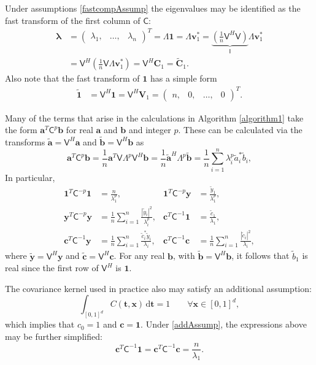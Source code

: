 \documentclass{iitthesis}          %
\newcommand{\bm}[1]{\boldsymbol{#1}}
\newcommand{\D}[1]{\text{d}{#1}}
\newcommand{\vlambda}{{\bm{\lambda}}}
\newcommand{\va}{\bm{a}}
\newcommand{\vb}{\bm{b}}
\newcommand{\vc}{\bm{c}}
\newcommand{\vC}{\bm{C}}
\newcommand{\vt}{\bm{t}}
\newcommand{\vv}{\bm{v}}
\newcommand{\vV}{\bm{V}}
\newcommand{\vx}{\bm{x}}
\newcommand{\vy}{\bm{y}}
\newcommand{\vone}{\bm{1}}
\newcommand{\mC}{\mathsf{C}}
\newcommand{\mCInv}{{\mathsf{C}^{-1}}}
\newcommand{\mLambda}{\mathsf{\Lambda}}
\newcommand{\mV}{\mathsf{V}}
\def\abs#1{\ensuremath{\left \lvert #1 \right \rvert}}
\begin{document}
Under assumptions \eqref{fastcompAssump} the eigenvalues may be identified as the fast transform of the first column of $\mC$:
\begin{align}
\nonumber
\vlambda 
& = \begin{pmatrix}
\lambda_1, &\dots, &\lambda_n
\end{pmatrix}^T = \mLambda \vone = \mLambda \vv_1^* 
= \underbrace{\left( \frac 1n \mV^H  \mV \right) }_{\mathsf{I}} \mLambda \vv_1^* \\
&= \mV^H \left( \frac 1n \mV \mLambda \vv_1^* \right)
= \mV^H \vC_1 =  \widetilde{\vC}_1.
\label{eqn:fast_transform_to_eigvalues}
\end{align}
Also note that the fast transform of $\vone$ has a simple form
\begin{align*} 
\widetilde{\vone}
& = \mV^H \vone = \mV^H \vV_1 = \begin{pmatrix}n, & 0, & \dots, & 0 \end{pmatrix}^T.
\label{eqn:fast_transform_one}
\end{align*}

Many of the terms that arise in the calculations in  Algorithm \ref{algorithm1} take the form $\va^T\mC^{p}\vb$ for real $\va$ and $\vb$ and integer $p$.  These can be calculated via the transforms $\widetilde{\va} = \mV^H \va$ and $\widetilde{\vb} = \mV^H \vb$ as 
\begin{equation*}
\va^T\mC^p\vb = \frac 1n \va^T \mV \mLambda^p \mV^H \vb
= \frac 1n \widetilde{\va}^H\mLambda^p \widetilde{\vb}
= \frac 1n \sum_{i=1}^n \lambda_i^p \widetilde{a}_i^* \widetilde{b}_i, 
\end{equation*}
In particular,
\begin{align*}
\vone^T\mC^{-p}\vone & = \frac{n}{\lambda_1^p},
&
\vone^T\mC^{-p}\vy &= \frac{\widetilde{y}_1}{\lambda_1^p},
\\
\vy^T\mC^{-p} \vy &= \frac 1n \sum_{i=1}^n \frac{\abs{\widetilde{y}_i}^2}{\lambda_i^p},
&
\vc^T\mCInv \vone &= \frac{\widetilde{c}_1}{\lambda_1},\\
\vc^T\mCInv \vy &= \frac 1n \sum_{i=1}^n \frac{\widetilde{c}_i^* \widetilde{y}_i}{\lambda_i}, & 
\vc^T\mCInv \vc &= \frac 1n \sum_{i=1}^n \frac{\abs{\widetilde{c}_i}^2}{\lambda_i},
\end{align*}
where $\widetilde{\vy} = \mV^H \vy$ and 
$\widetilde{\vc} = \mV^H \vc$.  For any real $\vb$, with $\widetilde{\vb} = \mV^H\vb$, it follows that $\widetilde{b}_1$ is real since the first row of $\mV^H$ is $\vone$.

The covariance kernel used in practice also may satisfy an additional assumption:
\begin{equation} \label{addAssump}
\int_{[0,1]^d} C(\vt,\vx) \, \D \vt = 1 \qquad \forall \vx \in [0,1]^d,
\end{equation}
which implies that $c_0 = 1$ and $\vc = \vone$.  Under \eqref{addAssump}, the expressions above may be further simplified:
\begin{equation*}
\vc^T\mCInv \vone =
\vc^T\mCInv \vc = \frac{n}{\lambda_1}.
\end{equation*}
\end{document}

